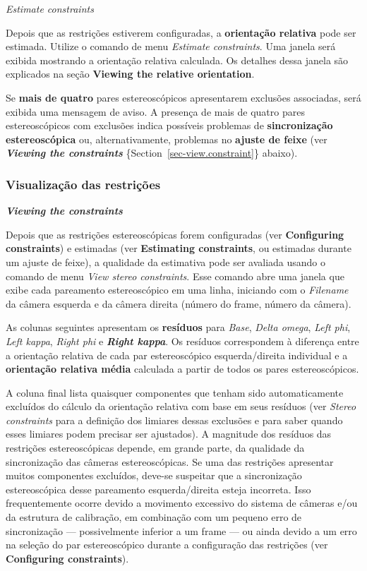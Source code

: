\documentclass[
  12pt,
  letterpaper,
  DIV=11,
  numbers=noendperiod]{scrreprt}
\begin{document}
\emph{Estimate constraints}

Depois que as restrições estiverem configuradas, a \textbf{orientação
relativa} pode ser estimada. Utilize o comando de menu \emph{Estimate
constraints}. Uma janela será exibida mostrando a orientação relativa
calculada. Os detalhes dessa janela são explicados na seção
\textbf{Viewing the relative orientation}.

Se \textbf{mais de quatro} pares estereoscópicos apresentarem exclusões
associadas, será exibida uma mensagem de aviso. A presença de mais de
quatro pares estereoscópicos com exclusões indica possíveis problemas de
\textbf{sincronização estereoscópica} ou, alternativamente, problemas no
\textbf{ajuste de feixe} (ver \textbf{\emph{Viewing the constraints}}
\{Section~\ref{sec-view.constraint}\} abaixo).

\subsubsection{\texorpdfstring{\textbf{Visualização das
restrições}}{Visualização das restrições}}\label{visualizauxe7uxe3o-das-restriuxe7uxf5es}

\textbf{\emph{Viewing the constraints}}

Depois que as restrições estereoscópicas forem configuradas (ver
\textbf{Configuring constraints}) e estimadas (ver \textbf{Estimating
constraints}, ou estimadas durante um ajuste de feixe), a qualidade da
estimativa pode ser avaliada usando o comando de menu \emph{View stereo
constraints}. Esse comando abre uma janela que exibe cada pareamento
estereoscópico em uma linha, iniciando com o \emph{Filename} da câmera
esquerda e da câmera direita (número do frame, número da câmera).

As colunas seguintes apresentam os \textbf{resíduos} para \emph{Base},
\emph{Delta omega}, \emph{Left phi}, \emph{Left kappa}, \emph{Right phi}
e \textbf{\emph{Right kappa}}. Os resíduos correspondem à diferença
entre a orientação relativa de cada par estereoscópico esquerda/direita
individual e a \textbf{orientação relativa média} calculada a partir de
todos os pares estereoscópicos.

A coluna final lista quaisquer componentes que tenham sido
automaticamente excluídos do cálculo da orientação relativa com base em
seus resíduos (ver \emph{Stereo constraints} para a definição dos
limiares dessas exclusões e para saber quando esses limiares podem
precisar ser ajustados). A magnitude dos resíduos das restrições
estereoscópicas depende, em grande parte, da qualidade da sincronização
das câmeras estereoscópicas. Se uma das restrições apresentar muitos
componentes excluídos, deve-se suspeitar que a sincronização
estereoscópica desse pareamento esquerda/direita esteja incorreta. Isso
frequentemente ocorre devido a movimento excessivo do sistema de câmeras
e/ou da estrutura de calibração, em combinação com um pequeno erro de
sincronização --- possivelmente inferior a um frame --- ou ainda devido
a um erro na seleção do par estereoscópico durante a configuração das
restrições (ver \textbf{Configuring constraints}).
\end{document}
